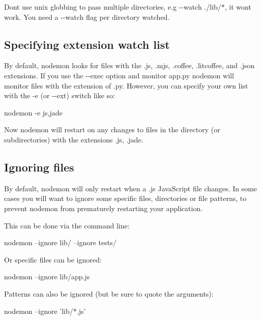Don\textquotesingle{}t use unix globbing to pass multiple directories, e.\+g {\ttfamily -\/-\/watch ./lib/$\ast$}, it won\textquotesingle{}t work. You need a {\ttfamily -\/-\/watch} flag per directory watched.

\subsection*{Specifying extension watch list}

By default, nodemon looks for files with the {\ttfamily .js}, {\ttfamily .mjs}, {\ttfamily .coffee}, {\ttfamily .litcoffee}, and {\ttfamily .json} extensions. If you use the {\ttfamily -\/-\/exec} option and monitor {\ttfamily app.\+py} nodemon will monitor files with the extension of {\ttfamily .py}. However, you can specify your own list with the {\ttfamily -\/e} (or {\ttfamily -\/-\/ext}) switch like so\+:


\begin{DoxyCode}
nodemon -e js,jade
\end{DoxyCode}


Now nodemon will restart on any changes to files in the directory (or subdirectories) with the extensions {\ttfamily .js}, {\ttfamily .jade}.

\subsection*{Ignoring files}

By default, nodemon will only restart when a {\ttfamily .js} Java\+Script file changes. In some cases you will want to ignore some specific files, directories or file patterns, to prevent nodemon from prematurely restarting your application.

This can be done via the command line\+:


\begin{DoxyCode}
nodemon --ignore lib/ --ignore tests/
\end{DoxyCode}


Or specific files can be ignored\+:


\begin{DoxyCode}
nodemon --ignore lib/app.js
\end{DoxyCode}


Patterns can also be ignored (but be sure to quote the arguments)\+:


\begin{DoxyCode}
nodemon --ignore 'lib/*.js'
\end{DoxyCode}


